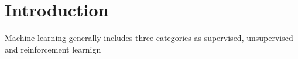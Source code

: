 \section{Introduction}

Machine learning generally includes three categories as supervised, unsupervised and reinforcement learnign 
